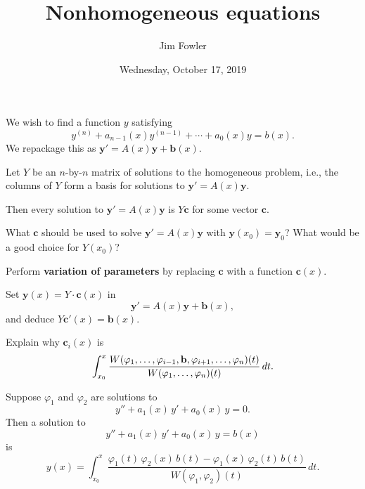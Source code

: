 \documentclass{homework}
\author{Jim Fowler}
\title{Nonhomogeneous equations}
\date{Wednesday, October 17, 2019}
\begin{document}
\maketitle

We wish to find a function $y$ satisfying
\[ y^{(n)} + a_{n-1}(x) y^{(n-1)} + \cdots + a_0(x) y = b(x). \]
We repackage this as $\mathbf{y}' = A(x) \mathbf{y} + \mathbf{b}(x)$.

\begin{problem}
  Let $Y$ be an $n$-by-$n$ matrix of solutions to the homogeneous
  problem, i.e., the columns of $Y$ form a basis for solutions to
  $\mathbf{y}' = A(x) \mathbf{y}$.

  Then every solution to $\mathbf{y}' = A(x) \mathbf{y}$ is $Y \mathbf{c}$ for some vector $\mathbf{c}$.
\end{problem}

\vfill

\begin{problem}
  What $\mathbf{c}$ should be used to solve
  $\mathbf{y}' = A(x) \mathbf{y}$ with
  $\mathbf{y}(x_0) = \mathbf{y}_0$?  What would be a good choice for
  $Y(x_0)$?
\end{problem}

\vfill

\begin{problem}
  Perform \textbf{variation of parameters} by replacing $\mathbf{c}$
  with a function $\mathbf{c}(x)$.
  
  Set $\mathbf{y}(x) = Y \cdot \mathbf{c}(x)$ in
  \[ \mathbf{y}' = A(x) \mathbf{y} + \mathbf{b}(x),
  \]
  and deduce $Y \mathbf{c}'(x) = \mathbf{b}(x)$.
\end{problem}

\vfill

\begin{problem}
  Explain why $\mathbf{c}_i(x)$ is
  \[
    \int_{x_0}^x \frac{W(\varphi_1,\ldots,\varphi_{i-1},\mathbf{b},\varphi_{i+1},\ldots,\\\varphi_n)(t)}
    {W(\varphi_1,\ldots,\varphi_n)(t)} \, dt.
  \]
\end{problem}

\vfill

\begin{problem}
  Suppose $\varphi_1$ and $\varphi_2$ are solutions to
  \[
    y'' + a_1(x) \, y' + a_0(x) \, y = 0.
  \]
  Then a solution to
  \[
    y'' + a_1(x) \, y' + a_0(x) \, y = b(x)
  \]
  is
  \[
    y(x) = \int_{x_0}^x \frac{\varphi_1(t) \, \varphi_2(x) \, b(t) -\varphi_1(x) \, \varphi_2(t) \, b(t)}{W(\varphi_1,\varphi_2)(t)} \, dt.
  \]
\end{problem}

\vfill
\end{document}
